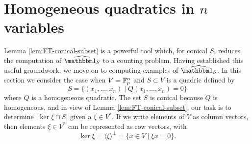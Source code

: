 \section{Homogeneous quadratics in $n$ variables}\label{sec:part1}
Lemma \ref{lem:FT-conical-subset} is a powerful tool which, for conical $S$, reduces the computation of $\widehat{\IND_S}$ to a counting problem. Having established this useful groundwork, we move on to computing examples of $\widehat{\IND_S}$. In this section we consider the case when $V = \mathbb{F}_p^n$ and $S \subset V$ is a quadric defined by
\[
	S = \{(x_1,\ldots,x_n) \mid Q(x_1,\ldots,x_n) = 0\}
\]
where $Q$ is a homogeneous quadratic. The set $S$ is conical because $Q$ is homogeneous, and in view of Lemma \ref{lem:FT-conical-subset}, our task is to determine $|\ker \xi \cap S|$ given a $\xi \in V^*$. If we write elements of $V$ as column vectors, then elements $\xi \in V^*$ can be represented as row vectors, with
\[
	\ker \xi = \langle \xi \rangle^\bot = \{x \in V \mid \xi x =0\}.
\]

